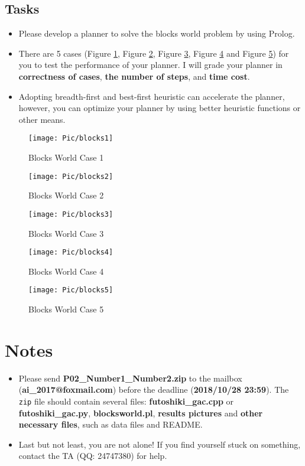 ﻿\documentclass[a4paper, 11pt]{article}
\begin{document}
\subsection{Tasks}
\begin{itemize}
    \item Please develop a planner to solve the blocks world problem by using Prolog. 
    \item There are 5 cases (Figure \ref{fig:blocks1}, Figure \ref{fig:blocks2}, Figure \ref{fig:blocks3}, Figure \ref{fig:blocks4} and Figure \ref{fig:blocks5}) for you to test the performance of your planner. I will grade your planner in \textbf{correctness of cases}, \textbf{the number of steps}, and \textbf{time cost}. 
    \item Adopting breadth-first and best-first heuristic can accelerate the planner, however, you can optimize your planner by using better heuristic functions or other means.
\end{itemize}
\begin{figure}[ht]
  \centering
  \texttt{[image: Pic/blocks1]}
  \caption{Blocks World Case 1}
  \label{fig:blocks1}
\end{figure}
\begin{figure}[htbp]
  \centering
  \texttt{[image: Pic/blocks2]}
  \caption{Blocks World Case 2}
  \label{fig:blocks2}
\end{figure}\begin{figure}[htbp]
  \centering
  \texttt{[image: Pic/blocks3]}
  \caption{Blocks World Case 3}
  \label{fig:blocks3}
\end{figure}\begin{figure}[ht]
  \centering
  \texttt{[image: Pic/blocks4]}
  \caption{Blocks World Case 4}
  \label{fig:blocks4}
\end{figure}\begin{figure}[ht]
  \centering
  \texttt{[image: Pic/blocks5]}
  \caption{Blocks World Case 5}
  \label{fig:blocks5}
\end{figure}
\section{Notes}
\begin{itemize}

\item Please send \textbf{P02\_Number1\_Number2.zip} to the mailbox (\textbf{ai\_2017@foxmail.com}) before the deadline (\textbf{2018/10/28 23:59}). The \texttt{zip} file should contain several files: \textbf{futoshiki\_gac.cpp} or \textbf{futoshiki\_gac.py}, \textbf{blocksworld.pl}, \textbf{results pictures} and \textbf{other necessary files}, such as data files and README. 
\item Last but not least, you are not alone! If you find yourself stuck on something, contact the TA (QQ: 24747380) for help.

\end{itemize}



%
%
\end{document}
